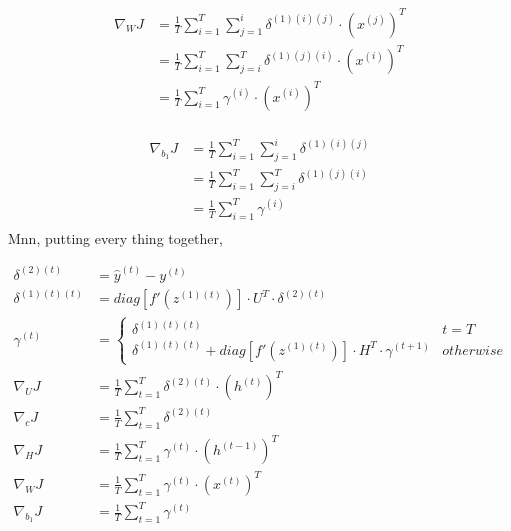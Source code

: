 \documentclass{article}
\begin{document}
	\begin{equation}
	\begin{aligned}
		\nabla_{W} J 
		&= \frac{1}{T} \sum_{i=1}^{T} \sum_{j=1}^{i} \delta^{(1)(i)(j)} \cdot  (x^{(j)})^T\\
		&= \frac{1}{T} \sum_{i=1}^{T} \sum_{j=i}^{T} \delta^{(1)(j)(i)} \cdot  (x^{(i)})^T\\
		&= \frac{1}{T} \sum_{i=1}^{T} \gamma^{(i)} \cdot  (x^{(i)})^T\\
	\end{aligned}
	\end{equation}
	
	\begin{equation}
	\begin{aligned}
		\nabla_{b_1} J 
		&= \frac{1}{T} \sum_{i=1}^{T} \sum_{j=1}^{i} \delta^{(1)(i)(j)} \\
		&= \frac{1}{T} \sum_{i=1}^{T} \sum_{j=i}^{T} \delta^{(1)(j)(i)} \\
		&= \frac{1}{T} \sum_{i=1}^{T} \gamma^{(i)} \\
	\end{aligned}
	\end{equation}
	Mnn, putting every thing together,
	\begin{framed}
	\begin{align}
		\delta^{(2)(t)} &= \hat{y}^{(t)} - y^{(t)} \\	
		\delta^{(1)(t)(t)} &= diag[f'(z^{(1)(t)})] \cdot U^T \cdot \delta^{(2)(t)}\\
		\gamma^{(t)} &= 
		\begin{cases}
		\delta^{(1)(t)(t)} &t=T \\
		\delta^{(1)(t)(t)} + diag[f'(z^{(1)(t)})] \cdot H^T \cdot \gamma^{(t+1)} & otherwise
		\end{cases}\\
		\nabla_U J &= \frac{1}{T} \sum_{t=1}^{T}\delta^{(2)(t)} \cdot (h^{
			(t)})^T\\
		\nabla_{c} J &= \frac{1}{T} \sum_{t=1}^{T}\delta^{(2)(t)} \\
		\nabla_H J &= \frac{1}{T} \sum_{t=1}^{T} \gamma^{(t)} \cdot  (h^{(t-1)})^T\\
		\nabla_W J &= \frac{1}{T} \sum_{t=1}^{T} \gamma^{(t)} \cdot  (x^{(t)})^T\\
		\nabla_{b_1} J &= \frac{1}{T} \sum_{t=1}^{T} \gamma^{(t)} \\
	\end{align}
	\end{framed}
\end{document}
